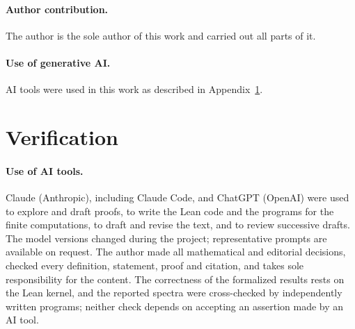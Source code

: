 \documentclass[11pt]{article}
\theoremstyle{definition}
\theoremstyle{remark}
\begin{document}
\paragraph{Author contribution.} The author is the sole author of this work and carried out all parts of it.

\paragraph{Use of generative AI.} AI tools were used in this work as described in Appendix~\ref{app:verification}.

\appendix
\section{Verification}\label{app:verification}

\paragraph{Use of AI tools.}
Claude (Anthropic), including Claude Code, and ChatGPT (OpenAI) were used to explore and draft proofs, to write the
Lean code and the programs for the finite computations, to draft and revise the text, and to review successive drafts.
The model versions changed during the project; representative prompts are available on request. The author made all
mathematical and editorial decisions, checked every definition, statement, proof and citation, and takes sole
responsibility for the content. The correctness of the formalized results rests on the Lean kernel, and the reported
spectra were cross-checked by independently written programs; neither check depends on accepting an assertion made by
an AI tool.
\end{document}
